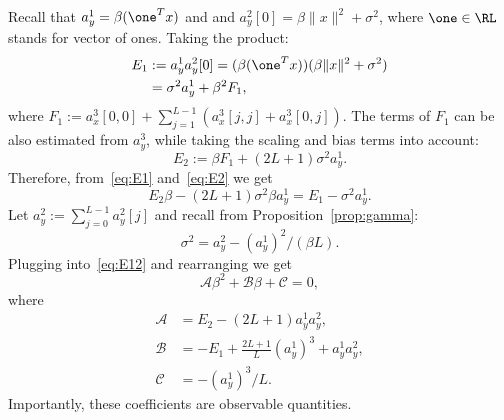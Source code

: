 \documentclass[9pt,twocolumn,twoside,lineno]{pnas-new}
\begin{document}
Recall that $a_y^1 = \beta(\one^Tx)$ and  
and $a_y^2[0] = \beta\|x\|^2+\sigma^2$, where $\one\in\RL$ stands for vector of ones. Taking the product:
\begin{equation}\label{eq:E1}
\begin{split}
E_1 &:= a_y^1a_y^2[0] =  (\beta(\one^Tx))(\beta\|x\|^2+\sigma^2) \\
& = \sigma^2a_y^1 + \beta^2F_1,
\end{split}
\end{equation}
where $F_1 := a_x^3[0,0] + \sum_{j=1}^{L-1}(a_x^3[j,j] + a_x^3[0,j])$. 
The terms of $F_1$ can be also estimated from $a_y^3$, while taking the scaling and bias terms into account:
\begin{equation} \label{eq:E2}
E_2:= \beta F_1 + (2L+1)\sigma^2a_y^1.
\end{equation}
Therefore, from~\eqref{eq:E1} and~\eqref{eq:E2} we get
\begin{equation} \label{eq:E12}
E_2\beta -(2L+1)\sigma^2\beta a_y^1 = E_1-\sigma^2a_y^1.
\end{equation}
Let $a_y^2:=\sum_{j=0}^{L-1}a_y^2[j]$ and recall from Proposition~\ref{prop:gamma}:
\begin{equation} \label{eq:sigma2}
\sigma^2 = a_y^2 - (a^1_y)^2/(\beta L). 
\end{equation} 
Plugging into~\eqref{eq:E12} and rearranging we get 
\begin{equation} \label{eq:quad1}
\mathcal{A}\beta^2 + \mathcal{B}\beta + \mathcal{C} = 0,
\end{equation}
where 
\begin{align*}
\mathcal{A} &= E_2 - (2L+1)a_y^1a_y^2, \\ 
\mathcal{B} &= -E_1 + \frac{2L+1}{L}(a_y^1)^3 + a_y^1a_y^2  , \\
\mathcal{C} &= -(a_y^1)^3/L.
\end{align*}
Importantly, these coefficients are observable quantities. 
\end{document}
